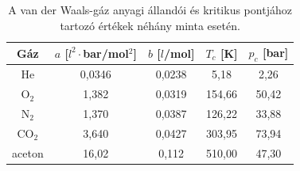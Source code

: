 \begin{table}[htb]
\centering
\begin{tabular}{|c|c|c|c|c|} \hline
Gáz & $a$ [$l^2\cdot$bar/mol$^2$] & $b$ [$l$/mol] & $T_c$ [K] & $p_c$ [bar]\\ \hline\hline
He & 0{,}0346 & 0{,}0238 & 5{,}18 & 2{,}26\\ \hline
O$_2$ & 1{,}382 & 0{,}0319 & 154{,}66 & 50{,}42\\ \hline
N$_2$ & 1{,}370 & 0{,}0387 & 126{,}22 & 33{,}88\\ \hline
CO$_2$ & 3{,}640 & 0{,}0427 & 303{,}95 & 73{,}94 \\ \hline
aceton & 16{,}02 & 0{,}112 & 510{,}00 & 47{,}30\\ \hline
\end{tabular}
\caption{A van der Waals-gáz anyagi állandói és kritikus pontjához tartozó értékek néhány minta esetén.}
\label{tab:vdW}
\end{table}